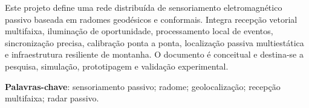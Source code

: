 \documentclass[11pt,openany,oneside,a4paper,chapter=TITLE,brazil]{abntex2}
\begin{document}
\hypersetup{pageanchor=false}
\imprimircapa
\begin{resumo}[Resumo]
Este projeto define uma rede distribuída de sensoriamento eletromagnético passivo baseada em radomes geodésicos e conformais. Integra recepção vetorial multifaixa, iluminação de oportunidade, processamento local de eventos, sincronização precisa, calibração ponta a ponta, localização passiva multiestática e infraestrutura resiliente de montanha. O documento é conceitual e destina-se a pesquisa, simulação, prototipagem e validação experimental.

\vspace{\onelineskip}
\noindent
\textbf{Palavras-chave}: sensoriamento passivo; radome; geolocalização; recepção multifaixa; radar passivo.
\end{resumo}
\clearpage
\hypersetup{pageanchor=true}
\tableofcontents*
\listoffigures*
\textual


\end{document}
